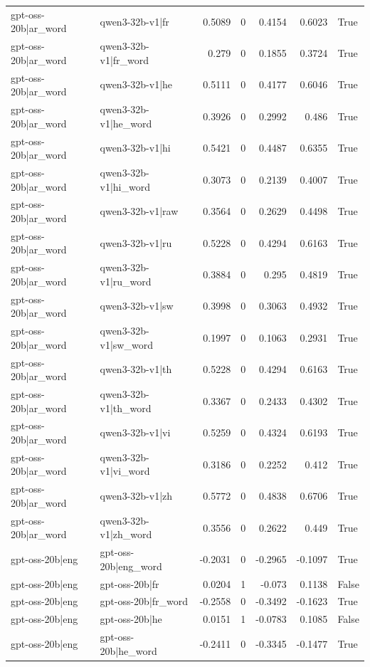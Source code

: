 \begin{table}
\begin{tabular}{l l r r r r l}
gpt-oss-20b|ar_word & qwen3-32b-v1|fr & 0.5089 & 0 & 0.4154 & 0.6023 & True \\
gpt-oss-20b|ar_word & qwen3-32b-v1|fr_word & 0.279 & 0 & 0.1855 & 0.3724 & True \\
gpt-oss-20b|ar_word & qwen3-32b-v1|he & 0.5111 & 0 & 0.4177 & 0.6046 & True \\
gpt-oss-20b|ar_word & qwen3-32b-v1|he_word & 0.3926 & 0 & 0.2992 & 0.486 & True \\
gpt-oss-20b|ar_word & qwen3-32b-v1|hi & 0.5421 & 0 & 0.4487 & 0.6355 & True \\
gpt-oss-20b|ar_word & qwen3-32b-v1|hi_word & 0.3073 & 0 & 0.2139 & 0.4007 & True \\
gpt-oss-20b|ar_word & qwen3-32b-v1|raw & 0.3564 & 0 & 0.2629 & 0.4498 & True \\
gpt-oss-20b|ar_word & qwen3-32b-v1|ru & 0.5228 & 0 & 0.4294 & 0.6163 & True \\
gpt-oss-20b|ar_word & qwen3-32b-v1|ru_word & 0.3884 & 0 & 0.295 & 0.4819 & True \\
gpt-oss-20b|ar_word & qwen3-32b-v1|sw & 0.3998 & 0 & 0.3063 & 0.4932 & True \\
gpt-oss-20b|ar_word & qwen3-32b-v1|sw_word & 0.1997 & 0 & 0.1063 & 0.2931 & True \\
gpt-oss-20b|ar_word & qwen3-32b-v1|th & 0.5228 & 0 & 0.4294 & 0.6163 & True \\
gpt-oss-20b|ar_word & qwen3-32b-v1|th_word & 0.3367 & 0 & 0.2433 & 0.4302 & True \\
gpt-oss-20b|ar_word & qwen3-32b-v1|vi & 0.5259 & 0 & 0.4324 & 0.6193 & True \\
gpt-oss-20b|ar_word & qwen3-32b-v1|vi_word & 0.3186 & 0 & 0.2252 & 0.412 & True \\
gpt-oss-20b|ar_word & qwen3-32b-v1|zh & 0.5772 & 0 & 0.4838 & 0.6706 & True \\
gpt-oss-20b|ar_word & qwen3-32b-v1|zh_word & 0.3556 & 0 & 0.2622 & 0.449 & True \\
gpt-oss-20b|eng & gpt-oss-20b|eng_word & -0.2031 & 0 & -0.2965 & -0.1097 & True \\
gpt-oss-20b|eng & gpt-oss-20b|fr & 0.0204 & 1 & -0.073 & 0.1138 & False \\
gpt-oss-20b|eng & gpt-oss-20b|fr_word & -0.2558 & 0 & -0.3492 & -0.1623 & True \\
gpt-oss-20b|eng & gpt-oss-20b|he & 0.0151 & 1 & -0.0783 & 0.1085 & False \\
gpt-oss-20b|eng & gpt-oss-20b|he_word & -0.2411 & 0 & -0.3345 & -0.1477 & True \\

\end{tabular}
\end{table}
